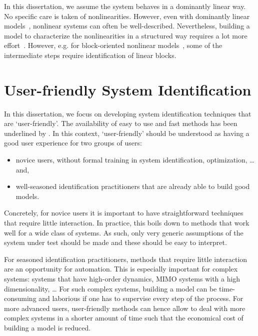 In this dissertation, we assume the system behaves in a dominantly linear way.
No specific care is taken of nonlinearities.
However, even with dominantly linear models~\citep{Schoukens2004}, nonlinear systems can often be well-described.
Nevertheless, building a model to characterize the nonlinearities in a structured way requires a lot more effort~\citep{Ljung2010,Giri2010,Sjoberg1995}.
However, e.g. for block-oriented nonlinear models~\citep{Giri2010}, some of the intermediate steps require identification of linear blocks.

\section{User-friendly System Identification}
In this dissertation, we focus on developing system identification techniques that are `user-friendly'.
The availability of easy to use and fast methods has been underlined by \citet{Gevers2011Challenges}.
In this context, `user-friendly' should be understood as having a good user experience for two groups of users:
\begin{itemize}
  \item novice users, without formal training in system identification, optimization, \ldots and,
  \item well-seasoned identification practitioners that are already able to build good models.
\end{itemize}
Concretely, for novice users it is important to have straightforward techniques that require little interaction.
In practice, this boils down to methods that work well for a wide class of systems.
As such, only very generic assumptions of the system under test should be made and these should be easy to interpret.

For seasoned identification practitioners, methods that require little interaction are an opportunity for automation.
This is especially important for complex systems: systems that have high-order dynamics, \gls{MIMO} systems with a high dimensionality, \ldots
For such complex systems, building a model can be time-consuming and laborious if one has to supervise every step of the process.
For more advanced users, user-friendly methods can hence allow to deal with more complex systems in a shorter amount of time such that the economical cost of building a model is reduced.


